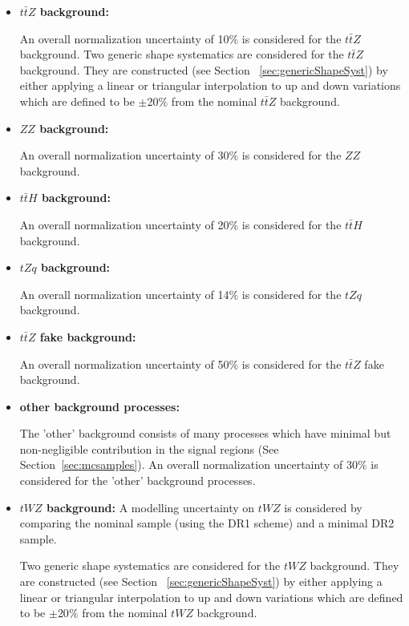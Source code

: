 \begin{itemize}
\item \textbf{$t\bar{t}Z$ background:}

An overall normalization uncertainty of 10$\%$ is considered for the $t\bar{t}Z$ background. Two generic shape systematics are considered for the $t\bar{t}Z$ background. They are constructed (see Section ~\ref{sec:genericShapeSyst}) by either applying a linear or triangular interpolation to up and down variations which are defined to be $\pm$20$\%$ from the nominal $t\bar{t}Z$ background.

\item \textbf{$ZZ$ background:}

An overall normalization uncertainty of 30$\%$ is considered for the $ZZ$ background.

\item \textbf{$t\bar{t}H$ background:}

An overall normalization uncertainty of 20$\%$ is considered for the $t\bar{t}H$ background.



\item \textbf{$tZq$ background:}

An overall normalization uncertainty of 14$\%$ is considered for the $tZq$ background.


\item \textbf{$t\bar{t}Z$ fake background:}

An overall normalization uncertainty of 50$\%$ is considered for the $t\bar{t}Z$ fake background.


\item \textbf{other background processes:}

The 'other' background consists of many processes which have minimal but non-negligible contribution in the signal regions (See Section~\ref{sec:mcsamples}). An overall normalization uncertainty of 30$\%$ is considered for the 'other' background processes.


\item \textbf{$tWZ$ background:}
A modelling uncertainty on $tWZ$ is considered by comparing the nominal sample (using the DR1 scheme) and a minimal DR2 sample.

Two generic shape systematics are considered for the $tWZ$ background. They are constructed (see Section ~\ref{sec:genericShapeSyst}) by either applying a linear or triangular interpolation to up and down variations which are defined to be $\pm$20$\%$ from the nominal $tWZ$ background.

\end{itemize}

